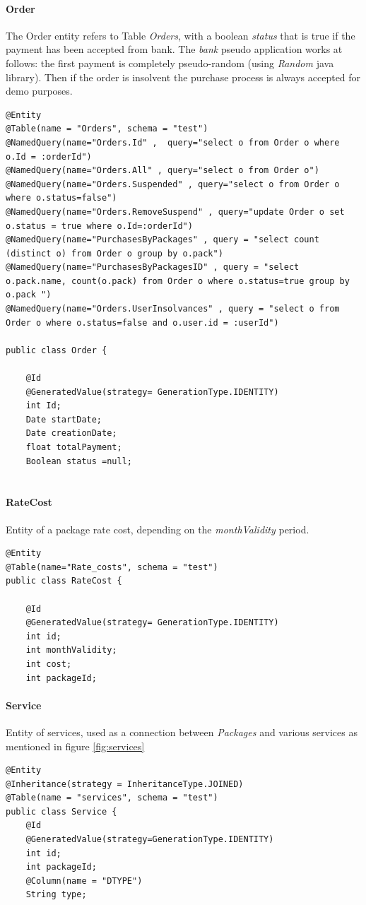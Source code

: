 \documentclass{article}
\begin{document}
\paragraph{Order}
The Order entity refers to Table \emph{Orders}, with a boolean \emph{status} that is true if the payment has been accepted from bank. The \emph{bank} pseudo application works at follows: the first payment is completely pseudo-random (using \emph{Random} java library). Then if the order is insolvent the purchase process is always accepted for demo purposes.
\begin{lstlisting}
@Entity
@Table(name = "Orders", schema = "test")
@NamedQuery(name="Orders.Id" ,  query="select o from Order o where o.Id = :orderId")
@NamedQuery(name="Orders.All" , query="select o from Order o") @NamedQuery(name="Orders.Suspended" , query="select o from Order o where o.status=false")
@NamedQuery(name="Orders.RemoveSuspend" , query="update Order o set o.status = true where o.Id=:orderId")
@NamedQuery(name="PurchasesByPackages" , query = "select count (distinct o) from Order o group by o.pack")
@NamedQuery(name="PurchasesByPackagesID" , query = "select  o.pack.name, count(o.pack) from Order o where o.status=true group by o.pack ")
@NamedQuery(name="Orders.UserInsolvances" , query = "select o from Order o where o.status=false and o.user.id = :userId")

public class Order {

    @Id
    @GeneratedValue(strategy= GenerationType.IDENTITY)
    int Id;
    Date startDate;
    Date creationDate;
    float totalPayment;
    Boolean status =null;
    
\end{lstlisting}


\paragraph{RateCost}
Entity of a package rate cost, depending on the \emph{monthValidity} period.
\begin{lstlisting}
@Entity
@Table(name="Rate_costs", schema = "test")
public class RateCost {

    @Id
    @GeneratedValue(strategy= GenerationType.IDENTITY)
    int id;
    int monthValidity;
    int cost;
    int packageId;
\end{lstlisting}

\paragraph{Service}
Entity of services, used as a connection between \emph{Packages} and various services as mentioned in figure \ref{fig:services}
\begin{lstlisting}
@Entity
@Inheritance(strategy = InheritanceType.JOINED)
@Table(name = "services", schema = "test")
public class Service {
    @Id
    @GeneratedValue(strategy=GenerationType.IDENTITY)
    int id;
    int packageId;
    @Column(name = "DTYPE")
    String type;
\end{lstlisting}
\end{document}
